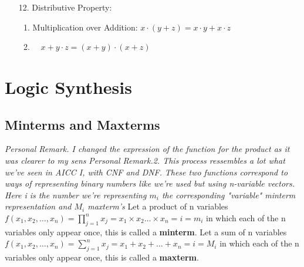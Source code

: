 \documentclass[12pt,openany, tikz,border=10pt]{book}
\begin{document}
\begin{multicols}{2}
\begin{enumerate}
\begin{enumerate}
                \end{enumerate}
                \item[12.] Distributive Property:
                \begin{enumerate}
                  \item Multiplication over Addition: \( x \cdot (y + z) = x \cdot y + x \cdot z \)
                  \item $\quad x + y \cdot z = (x + y) \cdot (x + z)$
                \end{enumerate}
            \end{enumerate}
            \end{multicols} %
            
        
        
        
\section{Logic Synthesis}
\subsection{Minterms and Maxterms}
\textit{Personal Remark. I changed the expression of the function for the product as it was clearer to my sens} \newline
\vspace{10px}
\textit{Personal Remark.2. This process ressembles a lot what we've seen in AICC I, with CNF and DNF.} \newline
\vspace{10px}
\textit{These two functions correspond to ways of representing binary numbers like we're used but using n-variable vectors. Here i is the number we're representing $m_i$ the corresponding "variable" minterm representation and $M_i$ maxterm's}\newline
\vspace{10px}
Let a product of n variables $f(x_{1}, x_{2}, \ldots, x_{n}) = \prod_{j=1}^{n}x_{j} = x_{1} \times x_{2} \ldots \times x_n = i = m_i$ in which each of the n variables only appear once, this is called a \textbf{minterm}. \newline
\vspace{5px}
Let a sum of n variables $f(x_{1}, x_{2}, \ldots, x_{n}) = \sum_{j=1}^{n}x_{j} = x_{1} + x_{2} + \ldots + x_n = i = M_i$ in which each of the n variables only appear once, this is called a \textbf{maxterm}. \newline
\end{document}
